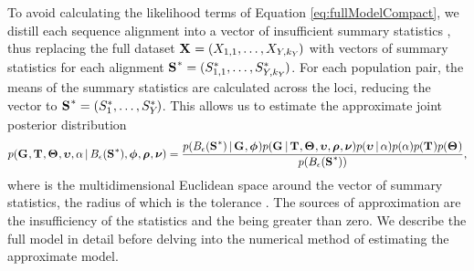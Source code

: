 \documentclass[letterpaper,12pt]{article}
\begin{document}
\begin{linenumbers}
\begin{linenomath}
To avoid calculating the likelihood terms of Equation \ref{eq:fullModelCompact},
we distill each sequence alignment \alignment{}{} into a vector of insufficient
summary statistics \alignmentSS{}{}, thus replacing the full dataset
$\alignmentVector = (\alignment{1}{1}, \ldots,
    \alignment{\npairs{}}{\nloci{\npairs{}}})$
with vectors of summary statistics for each alignment
$\ssVectorObs = (\alignmentSSObs{1}{1}, \ldots,
    \alignmentSSObs{\npairs{}}{\nloci{\npairs{}}})$.
For each population pair, the means of the summary statistics are calculated
across the \nloci{} loci, reducing the vector to
$\ssVectorObs = (\alignmentSSObs{1}{}, \ldots,
    \alignmentSSObs{\npairs{}}{})$.
This allows us to estimate the approximate joint posterior distribution
{\small
\begin{equation}
    p(\geneTreeVector, \divTimeMapVector, \demographicParamVector, 
    \locusMutationRateScalarVector, \locusRateHetShapeParameter \given
    \ssSpace, \hkyModelVector, \ploidyScalarVector,
    \mutationRateScalarConstantVector) =
    \frac{p(\ssSpace \given \geneTreeVector, \hkyModelVector)
        p(\geneTreeVector \given \divTimeMapVector, \demographicParamVector,
        \locusMutationRateScalarVector, \ploidyScalarVector,
        \mutationRateScalarConstantVector)
        p(\locusMutationRateScalarVector \given \locusRateHetShapeParameter)
        p(\locusRateHetShapeParameter)
        p(\divTimeMapVector)
        p(\demographicParamVector)}{
        p(\ssSpace)},
    \label{eq:approxModelCompact}
\end{equation}
}
where \ssSpace is the multidimensional Euclidean space around the vector of
summary statistics, the radius of which is the tolerance \tol.
The sources of approximation are the insufficiency of the statistics and the
\tol being greater than zero.
We describe the full model in detail before delving into the numerical
method of estimating the approximate model.
\end{linenomath}


\end{linenumbers}
\end{document}
